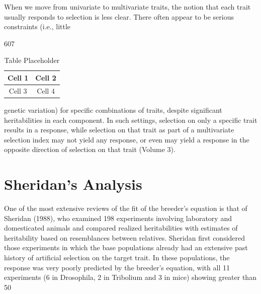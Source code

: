 \documentclass{article}
\begin{document}
When we move from univariate to multivariate traits, the notion that each trait usually responds to selection is less clear. There often appear to be serious constraints (i.e., little

607

\begin{table}[h]
\centering
\begin{tabular}{|c|c|}
\hline
Cell 1 & Cell 2 \\
\hline
Cell 3 & Cell 4 \\
\hline
\end{tabular}
\caption{Table Placeholder}
\end{table}

genetic variation) for specific combinations of traits, despite significant heritabilities in each component. In such settings, selection on only a specific trait results in a response, while selection on that trait as part of a multivariate selection index may not yield any response, or even may yield a response in the opposite direction of selection on that trait (Volume 3).

\section{Sheridan's Analysis}
One of the most extensive reviews of the fit of the breeder's equation is that of Sheridan (1988), who examined 198 experiments involving laboratory and domesticated animals and compared realized heritabilities with estimates of heritability based on resemblances between relatives. Sheridan first considered those experiments in which the base populations already had an extensive past history of artificial selection on the target trait. In these populations, the response was very poorly predicted by the breeder's equation, with all 11 experiments (6 in Drosophila, 2 in Tribolium and 3 in mice) showing greater than 50%
\end{document}
